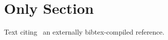 \documentclass{article}
\begin{document}
\section{Only Section}
Text citing~\cite{ext2021} an externally bibtex-compiled reference.

\end{document}
